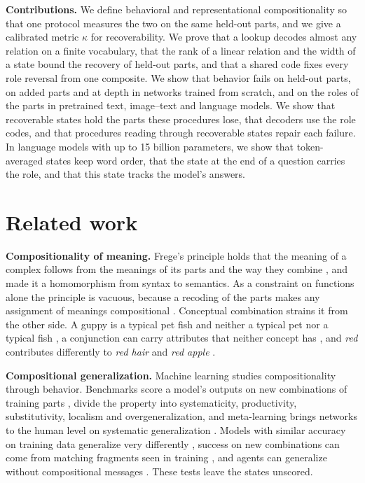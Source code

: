 \documentclass[10pt]{article}
\theoremstyle{plain}
\theoremstyle{remark}
\begin{document}
\textbf{Contributions.} We define behavioral and representational compositionality so that one protocol measures the two on the same held-out parts, and we give a calibrated metric $\kappa$ for recoverability. We prove that a lookup decodes almost any relation on a finite vocabulary, that the rank of a linear relation and the width of a state bound the recovery of held-out parts, and that a shared code fixes every role reversal from one composite. We show that behavior fails on held-out parts, on added parts and at depth in networks trained from scratch, and on the roles of the parts in pretrained text, image--text and language models. We show that recoverable states hold the parts these procedures lose, that decoders use the role codes, and that procedures reading through recoverable states repair each failure. In language models with up to 15 billion parameters, we show that token-averaged states keep word order, that the state at the end of a question carries the role, and that this state tracks the model's answers.

\section{Related work}
\label{sec:related}

\textbf{Compositionality of meaning.} Frege's principle holds that the meaning of a complex follows from the meanings of its parts and the way they combine \citep{frege1892,frege1923}, and \citet{montague1970} made it a homomorphism from syntax to semantics. As a constraint on functions alone the principle is vacuous, because a recoding of the parts makes any assignment of meanings compositional \citep{zadrozny1994,westerstahl1998}. Conceptual combination strains it from the other side. A guppy is a typical pet fish and neither a typical pet nor a typical fish \citep{osherson1981,fodor1996}, a conjunction can carry attributes that neither concept has \citep{hampton1987}, and \emph{red} contributes differently to \emph{red hair} and \emph{red apple} \citep{kamp1995}.

\textbf{Compositional generalization.} Machine learning studies compositionality through behavior. Benchmarks score a model's outputs on new combinations of training parts \citep{lake2018,keysers2020,kim2020cogs}, \citet{hupkes2020} divide the property into systematicity, productivity, substitutivity, localism and overgeneralization, and meta-learning brings networks to the human level on systematic generalization \citep{lake2023}. Models with similar accuracy on training data generalize very differently \citep{mccoy2020berts}, success on new combinations can come from matching fragments seen in training \citep{dziri2023}, and agents can generalize without compositional messages \citep{chaabouni2020}. These tests leave the states unscored.
\end{document}
